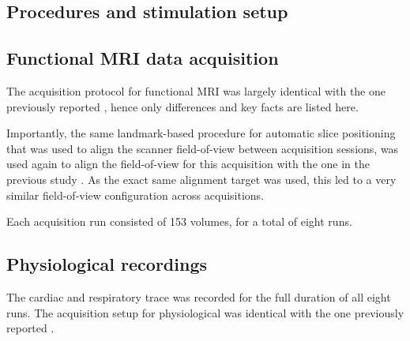 \subsection*{Procedures and stimulation setup}
\cite{Aguirre_2011}

\subsection*{Functional MRI data acquisition}

The acquisition protocol for functional MRI was largely identical with the one
previously reported \cite{Hanke_2014}, hence only differences and key facts are
listed here.

Importantly, the same landmark-based procedure for automatic slice positioning
that was used to align the scanner field-of-view between acquisition sessions,
was used again to align the field-of-view for this acquisition with the one in
the previous study \cite{Hanke_2014}. As the exact same alignment target was
used, this led to a very similar field-of-view configuration across
acquisitions.

Each acquisition run consisted of 153 volumes, for a total of eight runs.

\subsection*{Physiological recordings}

The cardiac and respiratory trace was recorded for the full duration of all
eight runs. The acquisition setup for physiological was identical with the one
previously reported \cite{Hanke_2014}.
